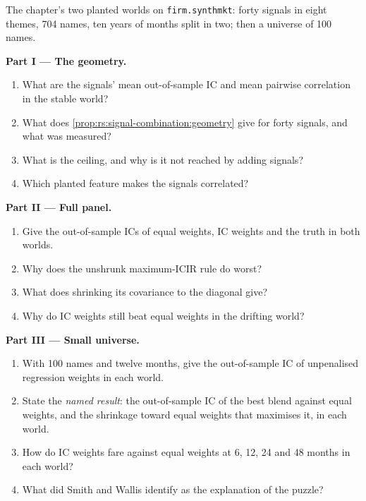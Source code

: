 \begin{problem}\label{pb:rs:signal-combination:1}
The chapter's two planted worlds on \texttt{firm.synthmkt}: forty signals in eight themes, 704 names, ten years of months split in two; then a
universe of 100 names.

\medskip\noindent\textbf{Part I --- The geometry.}
\begin{enumerate}
\item What are the signals' mean out-of-sample IC and mean pairwise correlation in the stable world?
\item What does \cref{prop:rs:signal-combination:geometry} give for forty signals, and what was measured?
\item What is the ceiling, and why is it not reached by adding signals?
\item Which planted feature makes the signals correlated?
\end{enumerate}

\medskip\noindent\textbf{Part II --- Full panel.}
\begin{enumerate}[resume]
\item Give the out-of-sample ICs of equal weights, IC weights and the truth in both worlds.
\item Why does the unshrunk maximum-ICIR rule do worst?
\item What does shrinking its covariance to the diagonal give?
\item Why do IC weights still beat equal weights in the drifting world?
\end{enumerate}

\medskip\noindent\textbf{Part III --- Small universe.}
\begin{enumerate}[resume]
\item With 100 names and twelve months, give the out-of-sample IC of unpenalised regression weights in each world.
\item State the \emph{named result}: the out-of-sample IC of the best blend against equal weights, and the shrinkage toward equal weights that
maximises it, in each world.
\item How do IC weights fare against equal weights at 6, 12, 24 and 48 months in each world?
\item What did Smith and Wallis identify as the explanation of the puzzle?
\end{enumerate}


\end{problem}
